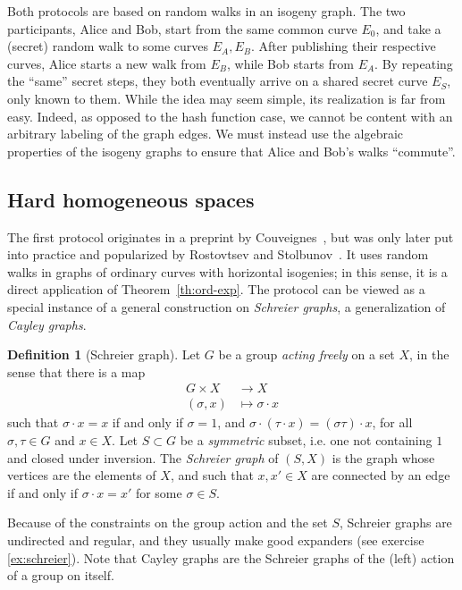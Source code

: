 \documentclass[10pt]{article}
\theoremstyle{plain}
\theoremstyle{definition}
\newtheorem{definition}[theorem]{Definition}
\begin{document}
Both protocols are based on random walks in an isogeny graph. %
The two participants, Alice and Bob, start from the same common curve
$E_0$, and take a (secret) random walk to some curves $E_A,E_B$. %
After publishing their respective curves, Alice starts a new walk from
$E_B$, while Bob starts from $E_A$. %
By repeating the ``same'' secret steps, they both eventually arrive on
a shared secret curve $E_S$, only known to them. %
While the idea may seem simple, its realization is far from easy. %
Indeed, as opposed to the hash function case, we cannot be content
with an arbitrary labeling of the graph edges. %
We must instead use the algebraic properties of the isogeny graphs to
ensure that Alice and Bob's walks ``commute''.

\subsection{Hard homogeneous spaces}

The first protocol originates in a preprint by Couveignes~\cite{Couv},
but was only later put into practice and popularized by Rostovtsev and
Stolbunov~\cite{R&S,Stol}. %
It uses random walks in graphs of ordinary curves with horizontal
isogenies; in this sense, it is a direct application of
Theorem~\ref{th:ord-exp}. %
The protocol can be viewed as a special instance of a general
construction on \emph{Schreier graphs}, a generalization of
\emph{Cayley graphs}.

\begin{definition}[Schreier graph]
  Let $G$ be a group \emph{acting freely} on a set $X$, in the sense
  that there is a map
  \begin{align*}
    G×X &\to X\\
    (σ,x) &\mapsto σ·x
  \end{align*}
  such that $σ·x=x$ if and only if $σ=1$, and $σ·(τ·x)=(στ)·x$, for
  all $σ,τ∈G$ and $x∈X$. %
  Let $S⊂G$ be a \emph{symmetric} subset, i.e. one not containing $1$
  and closed under inversion. %
  The \emph{Schreier graph} of $(S,X)$ is the graph whose vertices are
  the elements of $X$, and such that $x,x'∈X$ are connected by an edge
  if and only if $σ·x=x'$ for some $σ∈S$.
\end{definition}

Because of the constraints on the group action and the set $S$,
Schreier graphs are undirected and regular, and they usually make good
expanders (see exercise \ref{ex:schreier}). %
Note that Cayley graphs are the Schreier graphs of the (left) action
of a group on itself.
\end{document}
